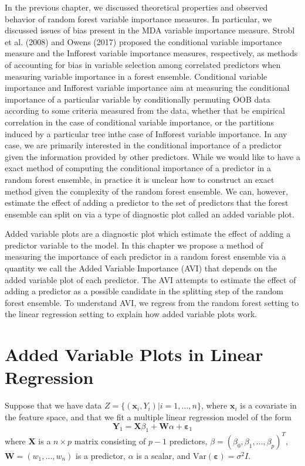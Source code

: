 \documentclass[12pt,twoside]{reedthesis}
\theoremstyle{definition}
\theoremstyle{definition}
\theoremstyle{definition}
\theoremstyle{remark}
\begin{document}
In the previous chapter, we discussed theoretical properties and
observed behavior of random forest variable importance measures. In
particular, we discussed issues of bias present in the MDA variable
importance measure. Strobl et al. (2008) and Owens (2017) proposed the
conditional variable importance measure and the Infforest variable
importance measures, respectively, as methods of accounting for bias in
variable selection among correlated predictors when measuring variable
importance in a forest ensemble. Conditional variable importance and
Infforest variable importance aim at measuring the conditional
importance of a particular variable by conditionally permuting OOB data
according to some criteria measured from the data, whether that be
empirical correlation in the case of conditional variable importance, or
the partitions induced by a particular tree inthe case of Infforest
variable importance. In any case, we are primarily interested in the
conditional importance of a predictor given the information provided by
other predictors. While we would like to have a exact method of
computing the conditional importance of a predictor in a random forest
ensemble, in practice it is unclear how to construct an exact method
given the complexity of the random forest ensemble. We can, however,
estimate the effect of adding a predictor to the set of predictors that
the forest ensemble can split on via a type of diagnostic plot called an
added variable plot. \par

Added variable plots are a diagnostic plot which estimate the effect of
adding a predictor variable to the model. In this chapter we propose a
method of measuring the importance of each predictor in a random forest
ensemble via a quantity we call the Added Variable Importance (AVI) that
depends on the added variable plot of each predictor. The AVI attempts
to estimate the effect of adding a predictor as a possible candidate in
the splitting step of the random forest ensemble. To understand AVI, we
regress from the random forest setting to the linear regression setting
to explain how added variable plots work. \par

\section{Added Variable Plots in Linear
Regression}\label{added-variable-plots-in-linear-regression}

Suppose that we have data \(Z=\{(\mathbf{x}_i,Y_i)|i=1,\ldots,n\}\),
where \(\mathbf{x}_i\) is a covariate in the feature space, and that we
fit a multiple linear regression model of the form
\[\mathbf{Y}_1=\mathbf{X}\beta_1+\mathbf{W}\alpha+\mathbf{\varepsilon}_1\]
where \(\mathbf{X}\) is a \(n\times p\) matrix consisting of \(p-1\)
predictors, \(\beta=(\beta_0,\beta_1,\ldots,\beta_p)^T\),
\(\mathbf{W}=(w_1,\ldots,w_n)\) is a predictor, \(\alpha\) is a scalar,
and \(\text{Var}(\mathbf{\varepsilon})=\sigma^2 I\). \par
\end{document}
